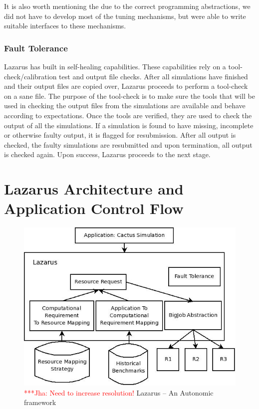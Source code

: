 \documentclass[conference,final]{IEEEtran}
\newcommand{\jhanote}[1]{ {\textcolor{red} { ***Jha: #1 }}}
\newcommand{\jhanote}[1]{}
\begin{document}
It is also worth mentioning the due to the correct programming
abstractions, we did not have to develop most of the tuning
mechanisms, but were able to write suitable interfaces to these
mechanisms.

\subsubsection{Fault Tolerance}
Lazarus has built in self-healing capabilities. These capabilities
rely on a tool-check/calibration test and output file checks. After
all simulations have finished and their output files are copied over,
Lazarus proceeds to perform a tool-check on a sane file. The purpose
of the tool-check is to make sure the tools that will be used in
checking the output files from the simulations are available and
behave according to expectations. Once the tools are verified, they
are used to check the output of all the simulations. If a simulation
is found to have missing, incomplete or otherwise faulty output, it is
flagged for resubmission.  After all output is checked, the faulty
simulations are resubmitted and upon termination, all output is
checked again. Upon success, Lazarus proceeds to the next stage.


\section{Lazarus Architecture and Application Control Flow}


\begin{figure}
\begin{center}
\includegraphics[scale=0.4]{./figures/Lazarus_01.jpeg}
\end{center}
\caption{\jhanote{Need to increase resolution!}  Lazarus -- An
  Autonomic framework}

\label{fig:application_architecture}
\end{figure}
\end{document}
